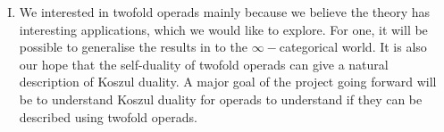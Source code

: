 \begin{enumerate}[I.]
    \item We interested in twofold operads mainly because we believe the theory has interesting applications, which we would like to explore. For one, it will be possible to generalise the results in \cite{BeilinsonDrinfeld} to the $\infty-$categorical world. It is also our hope that the self-duality of twofold operads can give a natural description of Koszul duality. A major goal of the project going forward will be to understand Koszul duality for operads to understand if they can be described using twofold operads.
\end{enumerate}